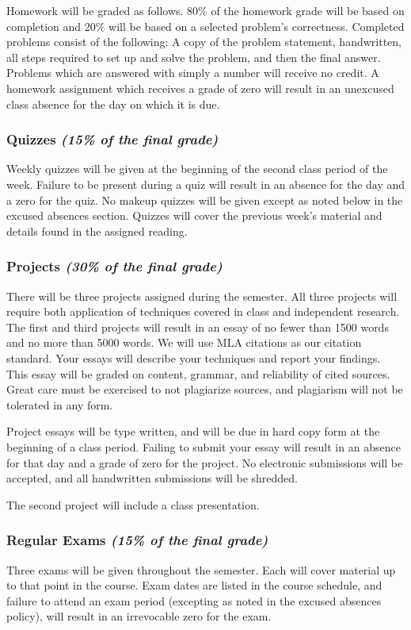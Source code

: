 \documentclass[11pt]{article}
\begin{document}
Homework will be graded as follows. 80\% of the homework grade will be
based on completion and 20\% will be based on a selected problem's
correctness. Completed problems consist of the following: A copy of
the problem statement, handwritten, all steps required to set up and
solve the problem, and then the final answer. Problems which are answered
with simply a number will receive no credit. A homework assignment
which receives a grade of zero will result in an unexcused class absence for
the day on which it is due.

\subsubsection*{Quizzes {\em(15\% of the final grade)}}
Weekly quizzes will be given at
the beginning of the second class period of the week.  Failure to be present
during a quiz will result in an absence for the day and a zero for
the quiz. No makeup quizzes will be given except as noted below in
the excused absences section. Quizzes will cover the previous week's
material and details found in the assigned reading.

\subsubsection*{Projects {\em (30\% of the final grade)}}
There will be three projects
assigned during the semester. All three projects will require both
application of techniques covered in class and independent research.
The first and third projects will result in an essay of no fewer than 1500 words and no more than 5000 words. We will use MLA citations as our citation standard.  Your essays will describe your techniques and report your
findings. This essay will be graded on content, grammar, and
reliability of cited sources. Great care must be exercised to not
plagiarize sources, and plagiarism will not be tolerated in any form.

Project essays will be type written, and will be due in hard copy form
at the beginning of a class period. Failing to submit your essay will
result in an absence for that day and a grade of zero for the project. No electronic submissions will be
accepted, and all handwritten submissions will be shredded.

The second project will include a class presentation.

\subsubsection*{Regular Exams {\em (15\% of the final grade)}}
Three exams will be given
throughout the semester. Each will cover material up to that point in
the course. Exam dates are listed in the course schedule, and failure to
attend an exam period (excepting as noted in the excused absences
policy), will result in an irrevocable zero for the exam.
\end{document}
